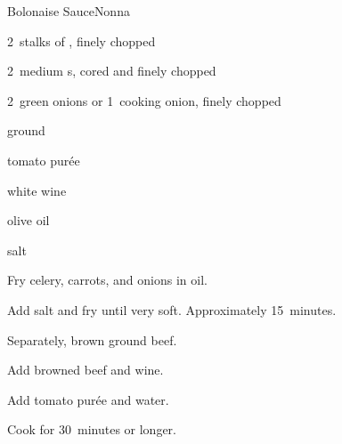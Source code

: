 \begin{recipe}{Bolonaise Sauce}{Nonna}{}

\begin{ingredients}
\item 2~stalks of , finely chopped
\item 2~medium s, cored and finely chopped
\item 2~green onions or 1~cooking onion, finely chopped
\item \lbs{\half} ground 
\item tomato pur\'ee
\item \C{\half} white wine
\item olive oil
\item salt
\end{ingredients}

\begin{directions}
\item Fry celery, carrots, and onions in oil.
\item Add salt and fry until very soft. Approximately 15~minutes.
\item Separately, brown ground beef.
\item Add browned beef and wine.
\item Add tomato pur\'ee and water.
\item Cook for 30~minutes or longer.
\end{directions}

\end{recipe}
